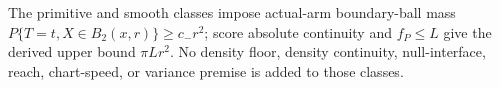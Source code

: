 The primitive and smooth classes impose actual-arm boundary-ball mass \(P\{T=t,X\in B_2(x,r)\}\geq c_-r^2\); score absolute continuity and \(f_P\leq L\) give the derived upper bound \(\pi Lr^2\).  No density floor, density continuity, null-interface, reach, chart-speed, or variance premise is added to those classes.